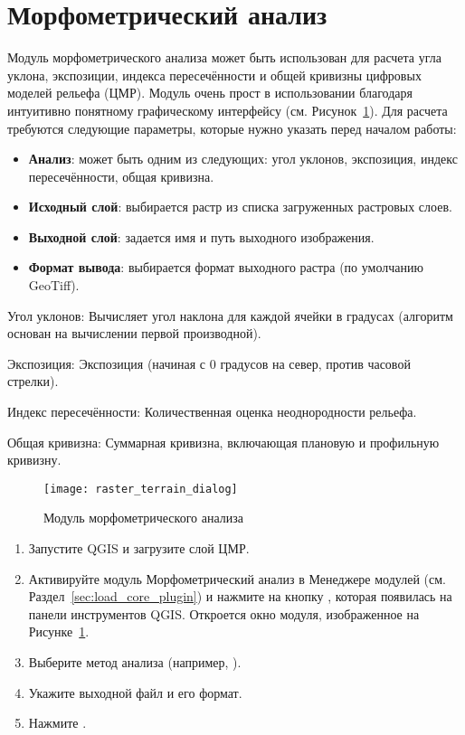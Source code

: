 
\section{Морфометрический анализ}


Модуль морфометрического анализа  может быть использован для расчета
угла уклона, экспозиции, индекса пересечённости и общей кривизны цифровых
моделей рельефа (ЦМР). Модуль очень прост в использовании благодаря
интуитивно понятному графическому интерфейсу
(см. Рисунок~\ref{fig:raster_terrain_dialog}). Для расчета требуются
следующие параметры, которые нужно указать перед началом работы:

\begin{itemize}[label=--]
\item \textbf{Анализ}: может быть одним из следующих: угол уклонов,
экспозиция, индекс пересечённости, общая кривизна.
\item \textbf{Исходный слой}: выбирается растр из списка загруженных растровых
слоев.
\item \textbf{Выходной слой}: задается имя и путь выходного изображения.
\item \textbf{Формат вывода}: выбирается формат выходного растра (по
умолчанию GeoTiff).
\end{itemize}

Угол уклонов: Вычисляет угол наклона для каждой ячейки в градусах (алгоритм
основан на вычислении первой производной).

Экспозиция: Экспозиция (начиная с 0 градусов на север, против часовой стрелки).

Индекс пересечённости: Количественная оценка неоднородности рельефа.

Общая кривизна: Суммарная кривизна, включающая плановую и профильную кривизну.

\begin{figure}[ht]
   \centering
   \texttt{[image: raster\_terrain\_dialog]}
   \caption{Модуль морфометрического анализа \nixcaption}\label{fig:raster_terrain_dialog}
\end{figure}

\label{raster_terrain_usage}

\begin{enumerate}
  \item Запустите QGIS и загрузите слой ЦМР.
  \item Активируйте модуль Морфометрический анализ в Менеджере модулей (см.
  Раздел~\ref{sec:load_core_plugin}) и нажмите на кнопку
  , которая появилась
  на панели инструментов QGIS. Откроется окно модуля, изображенное на
  Рисунке~\ref{fig:raster_terrain_dialog}.
  \item Выберите метод анализа (например, ).
  \item Укажите выходной файл и его формат.
  \item Нажмите .
\end{enumerate}

\FloatBarrier
